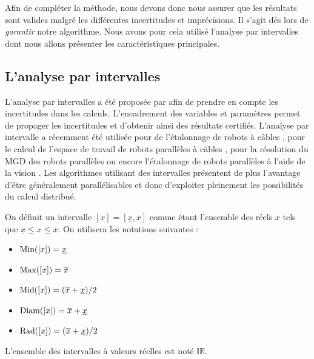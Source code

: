 Afin de compl\'eter la m\'ethode, nous devons donc nous assurer que les 
r\'esultats sont valides malgr\'e les diff\'erentes incertitudes et 
impr\'ecisions. Il s'agit d\`es lors de {\it garantir} notre algorithme. Nous 
avons pour cela utilis\'e l'analyse par intervalles dont nous allons pr\'esenter 
les caract\'eristiques principales.

\subsection{L'analyse par intervalles}

L'analyse par intervalles a \'et\'e propos\'ee par \cite{moore1968} afin de 
prendre en compte les incertitudes dans les calculs. L'encadrement des variables 
et param\`etres permet de propager les incertitudes et d'obtenir ainsi 
des r\'esultats certifi\'es. L'analyse par intervalle a r\'ecemment \'et\'e 
utilis\'ee pour de l'\'etalonnage de robots \`a c\^ables \cite{sandretto2012}, 
pour le calcul de l'espace de travail de robots parall\`eles \`a c\^ables 
\cite{gouttefarde2011}, pour la r\'esolution du MGD des robots parall\`eles 
\cite{merlet2004solving} ou encore l'\'etalonnage de robots parall\`eles \`a 
l'aide de la vision \cite{daney2006interval}. Les algorithmes utilisant des 
intervalles pr\'esentent de plus l'avantage d'\^etre g\'en\'eralement 
parall\'elisables et donc d'exploiter pleinement les possibilit\'es du calcul 
distribu\'e.

On d\'efinit un intervalle $[x] = [\underline{x},\overline{x}]$ comme \'etant 
l'ensemble des r\'eels $x$ tels que $\underline{x} \leq x \leq \overline{x}$.
On utilisera les notations suivantes :
\begin{itemize}
 \item $\hbox{Min}([x]) = \underline{x}$
  \item $\hbox{Max}([x]) = \overline{x}$
  \item $\hbox{Mid}([x]) = (\overline{x} + \underline{x})/2$
   \item $\hbox{Diam}([x]) = \overline{x} + \underline{x}$
    \item $\hbox{Rad}([x]) = (\overline{x} + \underline{x})/2$
\end{itemize}

L'ensemble des intervalles \`a valeurs r\'eelles est not\'e $\mathbb I \mathbb 
R$.

